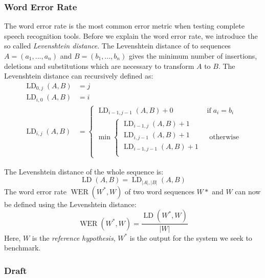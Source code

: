 \subsubsection{Word Error Rate}
The word error rate is the most common error metric when testing complete speech recognition tools. Before we explain the word error rate, we introduce the so called \textit{Levenshtein distance}. The Levenshtein distance of to sequences $A = (a_1,...,a_n)$ and $B=(b_1,...,b_n)$ gives the minimum number of insertions, deletions and substitutions which are necessary to transform $A$ to $B$. The Levenshtein distance can recursively defined as:
\begin{align*}
\operatorname{LD}_{0,j}(A, B) &= j \\
\operatorname{LD}_{i,0}(A, B) &= i \\
\operatorname{LD}_{i,j}(A, B) &= \begin{cases}
	\operatorname{LD}_{i-1,j-1}(A, B) + 0 & \text{if} \; a_i = b_i \\
	\min \begin{cases}
		\operatorname{LD}_{i-1,j}(A, B) + 1 \\
		\operatorname{LD}_{i,j-1}(A, B) + 1 \\
		\operatorname{LD}_{i-1,j-1}(A, B) + 1\\
	\end{cases} & \text{ otherwise}
\end{cases}
\end{align*}

The Levenshtein distance of the whole sequence is:
\[
\operatorname{LD}(A, B) = \operatorname{LD}_{|A|, |B|}(A, B)
\]
The word error rate $\operatorname{WER}(W^*, W)$ of two word sequences $W*$ and $W$ can now be defined using the Levenshtein distance: \\
\[
\operatorname{WER}(W^*, W) = \frac{\operatorname{LD}(W^*,W)}{|W|}
\]
Here, $W$ is the \textit{reference hypothesis}, $W^*$ is the output for the system we seek to benchmark.

\subsubsection{Draft}

